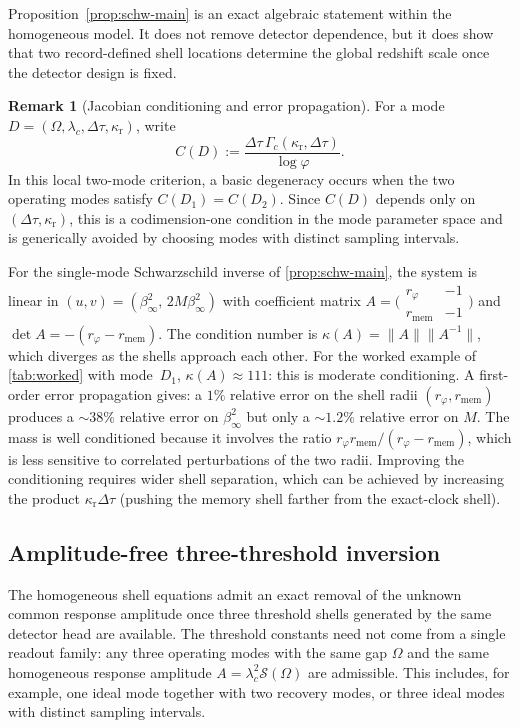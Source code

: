\documentclass[11pt]{article}
\theoremstyle{definition}
\newtheorem{remark}[theorem]{Remark}
\begin{document}
Proposition~\ref{prop:schw-main} is an exact algebraic statement within the homogeneous model. It does not remove detector dependence, but it does show that two record-defined shell locations determine the global redshift scale once the detector design is fixed.

\begin{remark}[Jacobian conditioning and error propagation]\label{rem:jacobian-main}
For a mode $D=(\Omega,\lambda_c,\Delta\tau,\kappa_{\mathrm r})$, write
\[
C(D):=
\frac{\Delta\tau\,\Gamma_c(\kappa_{\mathrm r},\Delta\tau)}{\log\varphi}.
\]
In this local two-mode criterion, a basic degeneracy occurs when the two operating modes satisfy $C(D_1)=C(D_2)$. Since $C(D)$ depends only on $(\Delta\tau,\kappa_{\mathrm r})$, this is a codimension-one condition in the mode parameter space and is generically avoided by choosing modes with distinct sampling intervals.

For the single-mode Schwarzschild inverse of \cref{prop:schw-main}, the system is linear in $(u,v)=(\beta_\infty^2,\,2M\beta_\infty^2)$ with coefficient matrix $A=\bigl(\begin{smallmatrix}r_\varphi & -1\\ r_{\mathrm{mem}} & -1\end{smallmatrix}\bigr)$ and $\det A=-(r_\varphi-r_{\mathrm{mem}})$. The condition number is $\kappa(A)=\|A\|\|A^{-1}\|$, which diverges as the shells approach each other. For the worked example of \cref{tab:worked} with mode~$D_1$, $\kappa(A)\approx111$: this is moderate conditioning. A first-order error propagation gives: a $1\%$ relative error on the shell radii $(r_\varphi,r_{\mathrm{mem}})$ produces a ${\sim}38\%$ relative error on $\beta_\infty^2$ but only a ${\sim}1.2\%$ relative error on $M$. The mass is well conditioned because it involves the ratio $r_\varphi r_{\mathrm{mem}}/(r_\varphi-r_{\mathrm{mem}})$, which is less sensitive to correlated perturbations of the two radii. Improving the conditioning requires wider shell separation, which can be achieved by increasing the product $\kappa_{\mathrm r}\Delta\tau$ (pushing the memory shell farther from the exact-clock shell).
\end{remark}

\subsection{Amplitude-free three-threshold inversion}\label{subsec:three-threshold}

The homogeneous shell equations admit an exact removal of the unknown common response amplitude once three threshold shells generated by the same detector head are available. The threshold constants need not come from a single readout family: any three operating modes with the same gap $\Omega$ and the same homogeneous response amplitude $A=\lambda_c^2\mathcal S(\Omega)$ are admissible. This includes, for example, one ideal mode together with two recovery modes, or three ideal modes with distinct sampling intervals.
\end{document}
